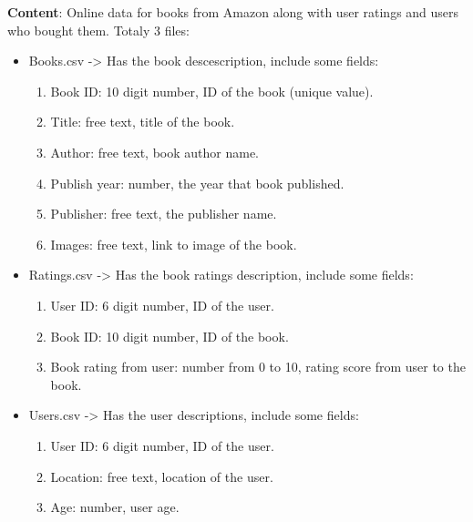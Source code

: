 \textbf{Content}: Online data for books from Amazon along with user ratings and users who bought them. Totaly 3 files:
\begin{itemize}
    \item Books.csv -> Has the book descescription, include some fields: 
    \begin{enumerate}
        \item Book ID: 10 digit number, ID of the book (unique value).
        \item Title: free text, title of the book. 
        \item Author: free text, book author name.
        \item Publish year: number, the year that book published. 
        \item Publisher: free text, the publisher name.
        \item Images: free text, link to image of the book.
    \end{enumerate}
    \item Ratings.csv -> Has the book ratings description, include some fields: 
    \begin{enumerate}
        \item User ID: 6 digit number, ID of the user.
        \item Book ID: 10 digit number, ID of the book.
        \item Book rating from user: number from 0 to 10, rating score from user to the book. 
    \end{enumerate}
    \item Users.csv -> Has the user descriptions, include some fields: 
    \begin{enumerate}
        \item User ID: 6 digit number, ID of the user.
        \item Location: free text, location of the user.
        \item Age: number, user age.
    \end{enumerate}
\end{itemize}


